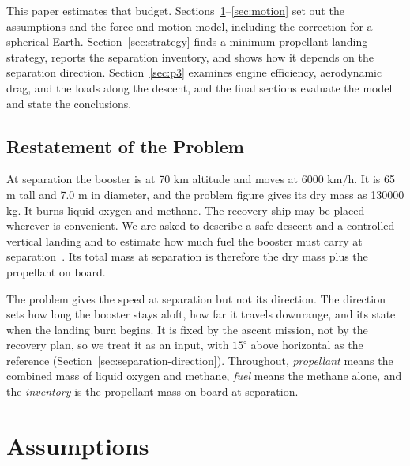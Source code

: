 \documentclass[12pt,a4paper]{article}
\begin{document}
This paper estimates that budget. Sections~\ref{sec:assumptions}--\ref{sec:motion} set out the assumptions and the force and motion model, including the correction for a spherical Earth. Section~\ref{sec:strategy} finds a minimum-propellant landing strategy, reports the separation inventory, and shows how it depends on the separation direction. Section~\ref{sec:p3} examines engine efficiency, aerodynamic drag, and the loads along the descent, and the final sections evaluate the model and state the conclusions.
\subsection{Restatement of the Problem}
At separation the booster is at 70 km altitude and moves at 6000 km/h. It is 65 m tall and 7.0 m in diameter, and the problem figure gives its dry mass as 130000 kg. It burns liquid oxygen and methane. The recovery ship may be placed wherever is convenient. We are asked to describe a safe descent and a controlled vertical landing and to estimate how much fuel the booster must carry at separation~\cite{problem}. Its total mass at separation is therefore the dry mass plus the propellant on board.

The problem gives the speed at separation but not its direction. The direction sets how long the booster stays aloft, how far it travels downrange, and its state when the landing burn begins. It is fixed by the ascent mission, not by the recovery plan, so we treat it as an input, with $15^\circ$ above horizontal as the reference (Section~\ref{sec:separation-direction}). Throughout, \emph{propellant} means the combined mass of liquid oxygen and methane, \emph{fuel} means the methane alone, and the \emph{inventory} is the propellant mass on board at separation.
\section{Assumptions}
\label{sec:assumptions}

\end{document}
